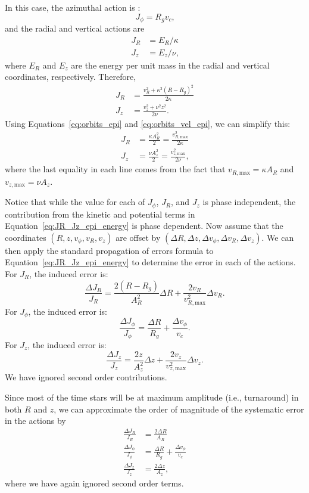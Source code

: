 \documentclass[twocolumn]{aastex62}
\newcommand{\beq}{\begin{equation}}
\newcommand{\eeq}{\end{equation}}
\begin{document}
In this case, 
the azimuthal action is
\citep[][Section~3.5.3b]{2008gady.book.....B}:
\beq\label{eq:Jphi_epi}
J_{\phi} = R_g v_c\text{,}
\eeq
and the radial and vertical actions are
\beq\label{eq:JR_Jz_epi}
\begin{split}
J_R &= E_R / \kappa \\
J_z &= E_z / \nu\text{,} 
\end{split}
\eeq
where $E_R$ and $E_z$ are the energy per unit mass in the radial and vertical
coordinates, respectively. Therefore,
\beq\label{eq:JR_Jz_epi_energy}
\begin{split}
J_R &= \frac{v_R^2 + \kappa^2 (R-R_g)^2}{2\kappa} \\
J_z &= \frac{v_z^2 + \nu^2 z^2}{2\nu}\text{.}
\end{split}
\eeq
Using Equations~\eqref{eq:orbits_epi} and \eqref{eq:orbits_vel_epi}, we can
simplify this:
\beq\label{eq:JR_Jz_epi_final}
\begin{split}
J_R &= \frac{\kappa A_R^2}{2} = \frac{v_{R,\text{max}}^2}{2\kappa} \\
J_z &= \frac{\nu A_z^2}{2} = \frac{v_{z,\text{max}}^2}{2\nu}\text{,}
\end{split}
\eeq
where the last equality in each line comes from the fact that
$v_{R,\text{max}} = \kappa A_R$ and $v_{z,\text{max}} = \nu A_z$.

Notice that while the value for each of $J_{\phi}$, $J_R$, and $J_z$ is phase
independent, the contribution from the kinetic and potential terms in
Equation~\eqref{eq:JR_Jz_epi_energy} is phase dependent. Now assume that the
coordinates $(R, z, v_{\phi}, v_R, v_z)$ are offset by $(\Delta R, \Delta z,
\Delta v_{\phi}, \Delta v_R, \Delta v_z)$. We can then apply the standard
propagation of errors formula to Equation~\eqref{eq:JR_Jz_epi_energy} to
determine the error in each of the actions. 
For $J_R$, the induced error is:
\beq\label{eq:induced_JR}
\frac{\Delta J_R}{J_R} = \frac{2(R-R_g)}{A_R^2}\Delta R
                         + \frac{2v_R}{v_{R,\text{max}}^2} \Delta v_R \text{.}
\eeq
For $J_{\phi}$, the induced error
is:
\beq\label{eq:induced_Jphi}
\frac{\Delta J_{\phi}}{J_{\phi}} = \frac{\Delta R}{R_g}
                                    + \frac{\Delta v_{\phi}}{v_c}\text{.}
\eeq
For $J_z$, the induced error is:
\beq\label{eq:induced_Jz}
\frac{\Delta J_z}{J_z} = \frac{2z}{A_z^2}\Delta z
                         + \frac{2v_z}{v_{z,\text{max}}^2} \Delta v_z \text{.}
\eeq
We have ignored second order contributions.

Since most of the time stars will be at maximum amplitude (i.e., turnaround)
in both $R$ and $z$, we can approximate the order of magnitude of the
systematic error in the actions by
\beq\label{eq:Ji_err_mosttime}
\begin{split}
\frac{\Delta J_{R}}{J_{R}} &= \frac{2\Delta R}{A_R} \\
\frac{\Delta J_{\phi}}{J_{\phi}} &= \frac{\Delta R}{R_g}
                                    + \frac{\Delta v_{\phi}}{v_c} \\
\frac{\Delta J_{z}}{J_{z}} &= \frac{2\Delta z}{A_z} \text{,}
\end{split}
\eeq
where we have again ignored second order terms.
\end{document}
